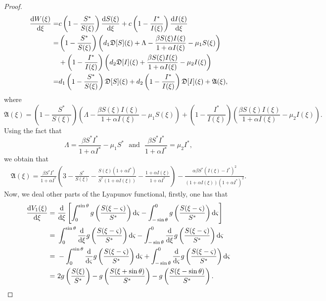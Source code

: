 \documentclass[final,3p,times]{elsarticle}
\numberwithin{equation}{section}
\def\d {{\rm d}}
\begin{document}
\begin{proof}
\begin{align*}
\frac{\d W(\xi)}{\d \xi} =& c \left(1-\frac{S^*}{S(\xi)}\right)\frac{\d S(\xi)}{\d \xi} + c \left(1-\frac{I^*}{I(\xi)}\right)\frac{\d I(\xi)}{\d \xi}\\
=& \left(1-\frac{S^*}{S(\xi)}\right)\left(d_1 \mathfrak{D}[S](\xi) + \Lambda - \frac{\beta S(\xi)I(\xi)}{1+\alpha I(\xi)} - \mu_1 S(\xi)\right)\\
& + \left(1-\frac{I^*}{I(\xi)}\right)\left(d_2 \mathfrak{D}[I](\xi) + \frac{\beta S(\xi)I(\xi)}{1+\alpha I(\xi)} - \mu_2 I(\xi)\right)\\
=& d_1 \left(1-\frac{S^*}{S(\xi)}\right) \mathfrak{D}[S](\xi) + d_2 \left(1-\frac{I^*}{I(\xi)}\right) \mathfrak{D}[I](\xi) + \mathfrak{A}(\xi),
\end{align*}
where
\[
\mathfrak{A}(\xi) = \left(1-\frac{S^*}{S(\xi)}\right)\left(\Lambda - \frac{\beta S(\xi)I(\xi)}{1+\alpha I(\xi)} - \mu_1 S(\xi)\right) + \left(1-\frac{I^*}{I(\xi)}\right)\left(\frac{\beta S(\xi)I(\xi)}{1+\alpha I(\xi)} - \mu_2 I(\xi)\right).
\]
Using the fact that
\[
\Lambda = \frac{\beta S^*I^*}{1+\alpha I^*} - \mu_1 S^*\ \ \ \textrm{and}\ \ \ \frac{\beta S^*I^*}{1+\alpha I^*} = \mu_2 I^*,
\]
we obtain that
\begin{align*}
\mathfrak{A}(\xi) = \frac{\beta S^*I^*}{1+\alpha I^*}\left(3 - \frac{S^*}{S(\xi)} - \frac{S(\xi)(1+\alpha I^*)}{S^* (1+\alpha I(\xi))} - \frac{1+\alpha I(\xi)}{1+\alpha I^*}\right) - \frac{\alpha \beta S^* (I(\xi)-I^*)^2}{(1+\alpha I(\xi))(1+\alpha I^*)^2}.
\end{align*}
Now, we deal other parts of the Lyapunov functional, firstly, one has that
\begin{align*}
\frac{\d V_1(\xi)}{\d \xi} = &\ \frac{\d}{\d \xi} \left[\int_0^{\sin\theta} g\left(\frac{S(\xi-\varsigma)}{S^*}\right)\d \varsigma - \int_{-\sin\theta}^0 g\left(\frac{S(\xi-\varsigma)}{S^*}\right)\d \varsigma\right]\\
= &\  \int_0^{\sin\theta} \frac{\d}{\d \xi}g\left(\frac{S(\xi-\varsigma)}{S^*}\right)\d \varsigma - \int_{-\sin\theta}^0 \frac{\d}{\d \xi}g\left(\frac{S(\xi-\varsigma)}{S^*}\right)\d \varsigma\\
= &\  -\int_0^{\sin\theta} \frac{\d}{\d \varsigma}g\left(\frac{S(\xi-\varsigma)}{S^*}\right)\d \varsigma + \int_{-\sin\theta}^0 \frac{\d}{\d \varsigma}g\left(\frac{S(\xi-\varsigma)}{S^*}\right)\d \varsigma\\
= &\ 2 g\left(\frac{S(\xi)}{S^*}\right) - g\left(\frac{S(\xi+\sin\theta)}{S^*}\right) - g\left(\frac{S(\xi-\sin\theta)}{S^*}\right).
\end{align*}

\end{proof}
\end{document}
